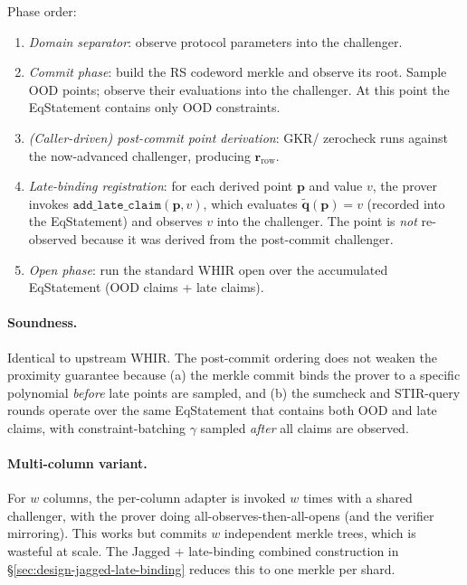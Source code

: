\begin{construction}
\label{cons:late-binding}
Phase order:
\begin{enumerate}
  \item \emph{Domain separator}: observe protocol parameters into the
        challenger.
  \item \emph{Commit phase}: build the RS codeword merkle and
        observe its root.  Sample OOD points; observe their
        evaluations into the challenger.  At this point the
        EqStatement contains only OOD constraints.
  \item \emph{(Caller-driven) post-commit point derivation}: GKR/
        zerocheck runs against the now-advanced challenger,
        producing $\mathbf{r}_{\mathrm{row}}$.
  \item \emph{Late-binding registration}: for each derived point
        $\mathbf{p}$ and value $v$, the prover invokes
        $\mathtt{add\_late\_claim}(\mathbf{p}, v)$, which evaluates
        $\widetilde{\mathbf{q}}(\mathbf{p}) = v$ (recorded into the
        EqStatement) and observes $v$ into the challenger.  The
        point is \emph{not} re-observed because it was derived from
        the post-commit challenger.
  \item \emph{Open phase}: run the standard WHIR open over the
        accumulated EqStatement (OOD claims + late claims).
\end{enumerate}
\end{construction}

\paragraph{Soundness.}  Identical to upstream WHIR.  The
post-commit ordering does not weaken the proximity guarantee because
(a) the merkle commit binds the prover to a specific polynomial
\emph{before} late points are sampled, and (b) the sumcheck and
STIR-query rounds operate over the same EqStatement that contains
both OOD and late claims, with constraint-batching $\gamma$ sampled
\emph{after} all claims are observed.

\paragraph{Multi-column variant.}  For $w$ columns, the per-column
adapter is invoked $w$ times with a shared challenger, with the
prover doing all-observes-then-all-opens (and the verifier mirroring).
This works but commits $w$ independent merkle trees, which is
wasteful at scale.  The Jagged + late-binding combined construction
in \S\ref{sec:design-jagged-late-binding} reduces this to one merkle
per shard.

